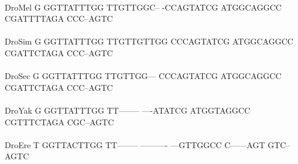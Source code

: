 \documentclass[11pt,twoside,reqno,a4paper]{article}
\begin{document}
{\\
DroMel	G	GGTTATTTGG	TTGTTGGC--	-CCAGTATCG	ATGGCAGGCC	CGATTTTAGA	CCC--AGTC\\
\hspace*{7\charwidth}\hspace*{1\charwidth}\hspace*{1\charwidth}\hspace*{1\charwidth}\hspace*{1\charwidth}\hspace*{1\charwidth}\hspace*{1\charwidth}\\
DroSim	G	GGTTATTTGG	TTGTTGTTGG	CCCAGTATCG	ATGGCAGGCC	CGATTCTAGA	CCC--AGTC\\
\hspace*{7\charwidth}\hspace*{1\charwidth}\hspace*{1\charwidth}\hspace*{1\charwidth}\hspace*{1\charwidth}\hspace*{1\charwidth}\hspace*{1\charwidth}\\
DroSec	G	GGTTATTTGG	TTGTTGG---	CCCAGTATCG	ATGGCAGGCC	CGATTCTAGA	CCC--AGTC\\
\hspace*{7\charwidth}\hspace*{1\charwidth}\hspace*{1\charwidth}\hspace*{1\charwidth}\hspace*{1\charwidth}\hspace*{1\charwidth}\hspace*{1\charwidth}\\
DroYak	G	GGTTATTTGG	TT--------	----ATATCG	ATGGTAGGCC	CGTTTCTAGA	CGC--AGTC\\
\hspace*{7\charwidth}\hspace*{1\charwidth}\hspace*{1\charwidth}\hspace*{1\charwidth}\hspace*{1\charwidth}\hspace*{1\charwidth}\hspace*{1\charwidth}\\
DroEre	T	GGTTACTTGG	TT--------	----------	---GTTGGCC	C------AGT	GTC--AGTC\\
\hspace*{7\charwidth}\hspace*{1\charwidth}\hspace*{1\charwidth}\hspace*{1\charwidth}\hspace*{1\charwidth}\hspace*{1\charwidth}\hspace*{1\charwidth}\\
}
\end{document}
